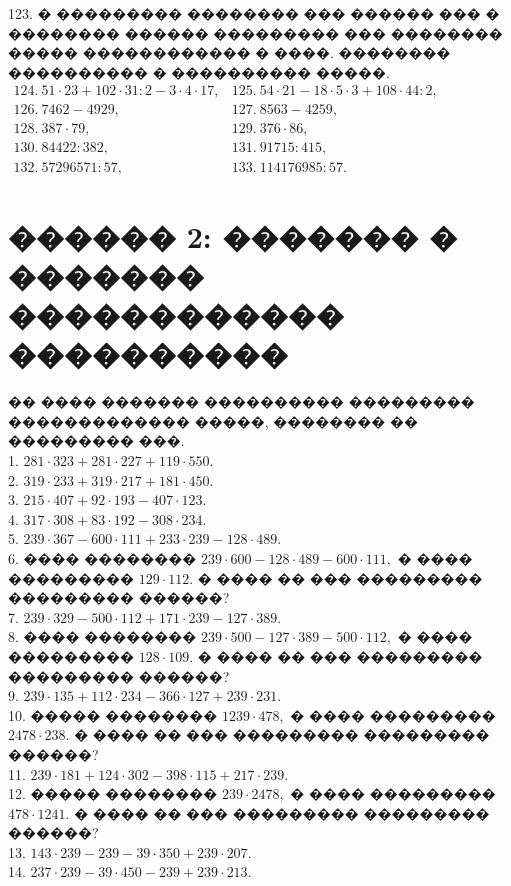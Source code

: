 \documentclass[12pt]{article}
\begin{document}
123. � ��������� �������� ��� ������ ��� � �������� ������ ��������� ��� �������� ����� ������������ � ����. �������� ���������� � ���������� �����.\\
$\begin{array}{lll}
124.\ 51 \cdot 23 + 102 \cdot 31 : 2 - 3 \cdot 4 \cdot 17,& 125.\ 54 \cdot 21 - 18 \cdot 5 \cdot 3 + 108 \cdot 44 : 2,\\
126.\ 7462-4929,& 127.\ 8563-4259,\\
128.\ 387\cdot79,& 129.\ 376\cdot86,\\
130.\ 84422:382,& 131.\ 91715:415,\\
132.\ 57296571 : 57, & 133.\ 114176985 : 57.
\end{array}$
\newpage
\section{������ 2: ������� � ������� ������������ ����������}
�� ���� ������� ���������� ��������� ������������� �����, �������� �� ��������� ���.\\
1. $281\cdot323+281\cdot227+119\cdot550.$\\
2. $319\cdot233+319\cdot217+181\cdot450.$\\
3. $215\cdot407+92\cdot193-407\cdot123.$\\
4. $317\cdot308+83\cdot192-308\cdot234.$\\
5. $239\cdot367-600\cdot111+233\cdot239-128\cdot489.$\\
6. ���� �������� $239\cdot600-128\cdot489-600\cdot111,$ � ���� ��������� $129\cdot112.$ � ���� �� ��� ��������� ��������� ������?\\
7. $239\cdot329-500\cdot112+171\cdot239-127\cdot389.$\\
8. ���� �������� $239\cdot500-127\cdot389-500\cdot112,$ � ���� ��������� $128\cdot109.$ � ���� �� ��� ��������� ��������� ������?\\
9. $239\cdot135+112\cdot234-366\cdot127+239\cdot231.$\\
10. ����� �������� $1239\cdot 478,$ � ���� ��������� $2478\cdot238.$ � ���� �� ��� ��������� ��������� ������?\\
11. $239\cdot181+124\cdot302-398\cdot115+217\cdot239.$\\
12. ����� �������� $239\cdot2478,$ � ���� ��������� $478\cdot1241.$ � ���� �� ��� ��������� ��������� ������?\\
13. $143\cdot239-239-39\cdot350+239\cdot207.$\\
14. $237\cdot239-39\cdot450-239+239\cdot213.$\\
\end{document}
